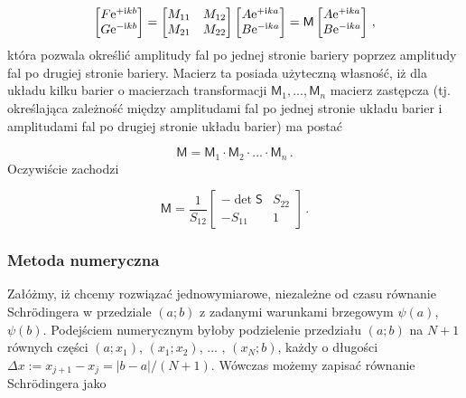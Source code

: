 \documentclass{myclass}
\begin{document}
\begin{equation*}
\begin{bmatrix}
F\mathrm{e}^{+\mathrm{i} kb}\\
G\mathrm{e}^{-\mathrm{i} kb}
\end{bmatrix}=\begin{bmatrix}
M_{11} & M_{12}\\
M_{21} & M_{22}
\end{bmatrix}\begin{bmatrix}
A\mathrm{e}^{+\mathrm{i} ka}\\
B\mathrm{e}^{-\mathrm{i} ka}
\end{bmatrix}=\mathsf{M}\begin{bmatrix}
A\mathrm{e}^{+\mathrm{i} ka}\\
B\mathrm{e}^{-\mathrm{i} ka}
\end{bmatrix}\,,
\end{equation*}
która pozwala określić amplitudy fal po jednej stronie bariery poprzez amplitudy fal po drugiej
stronie bariery. Macierz ta posiada użyteczną własność, iż dla układu kilku barier o macierzach
transformacji \(\mathsf{M}_1,...,\mathsf{M}_n\) macierz zastępcza (tj. określająca zależność między
amplitudami fal po jednej stronie układu barier i amplitudami fal po drugiej stronie układu barier)
ma postać

\begin{equation*}
\mathsf{M}=\mathsf{M}_1\cdot\mathsf{M}_2\cdot...\cdot\mathsf{M}_n\,.
\end{equation*}
Oczywiście zachodzi

\begin{equation*}
\mathsf{M}=\frac{1}{S_{12}}\begin{bmatrix}
-\det\mathsf{S} & S_{22}\\
-S_{11} & 1
\end{bmatrix}\,.
\end{equation*}

\subsubsection{Metoda numeryczna}

Załóżmy, iż chcemy rozwiązać jednowymiarowe, niezależne od czasu równanie Schr{\"o}dingera w
przedziale \((a;b)\) z zadanymi warunkami brzegowym \(\psi(a)\), \(\psi(b)\). Podejściem numerycznym
byłoby podzielenie przedziału \((a;b)\) na \(N+1\) równych części \((a;x_1)\), \((x_1;x_2)\), ... ,
\((x_{N};b)\), każdy o długości \(\Delta x:=x_{j+1}-x_{j}=|b-a|/(N+1)\). Wówczas możemy zapisać
równanie Schr{\"o}dingera jako
\end{document}

